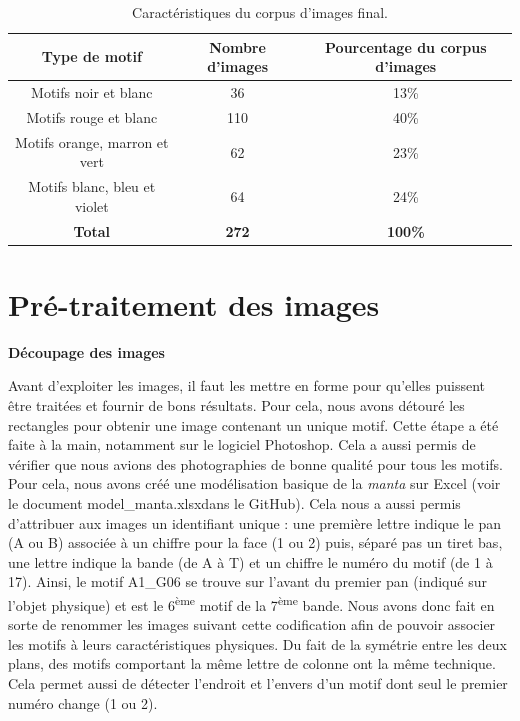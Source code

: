 \documentclass[a4paper, twoside, 12pt]{book}
\begin{document}
\begin{table}[!h]
    \centering
    \begin{tabular}{|c|c|c|}
        \hline
        \cellcolor{blue!20}\textbf{Type de motif }& \cellcolor{blue!20} \textbf{Nombre d'images} & \cellcolor{blue!20} \textbf{Pourcentage du corpus d'images} \\ \hline \hline
        Motifs noir et blanc & 36 & 13\% \\ \hline
        Motifs rouge et blanc & 110 & 40\% \\ \hline
        Motifs orange, marron et vert  & 62 & 23\% \\ \hline
        Motifs blanc, bleu et violet  & 64 & 24\% \\ \hline
        \textbf{Total} & \textbf{272} & \textbf{100\%} \\ \hline
        
    \end{tabular}
    \caption{Caractéristiques du corpus d'images final.}
    \label{tab:tableau2}
\end{table}

\section{Pré-traitement des images}

\textbf{Découpage des images}

Avant d'exploiter les images, il faut les mettre en forme pour qu'elles puissent être traitées et fournir de bons résultats. Pour cela, nous avons détouré les rectangles pour obtenir une image contenant un unique motif. Cette étape a été faite à la main, notamment sur le logiciel Photoshop. Cela a aussi permis de vérifier que nous avions des photographies de bonne qualité pour tous les motifs. Pour cela, nous avons créé une modélisation basique de la \textit{manta} sur Excel (voir le document \og model\_manta.xlsx\fg \:dans le GitHub). Cela nous a aussi permis d'attribuer aux images un identifiant unique : une première lettre indique le pan (A ou B) associée à un chiffre pour la face (1 ou 2) puis, séparé pas un tiret bas, une lettre indique la bande (de A à T) et un chiffre le numéro du motif (de 1 à 17). Ainsi, le motif A1\_G06 se trouve sur l'avant du premier pan (indiqué sur l'objet physique) et est le 6\textsuperscript{ème} motif de la 7\textsuperscript{ème} bande. Nous avons donc fait en sorte de renommer les images suivant cette codification afin de pouvoir associer les motifs à leurs caractéristiques physiques. Du fait de la symétrie entre les deux plans, des motifs comportant la même lettre de colonne ont la même technique. Cela permet aussi de détecter l'endroit et l'envers d'un motif dont seul le premier numéro change (1 ou 2). \\
\end{document}
